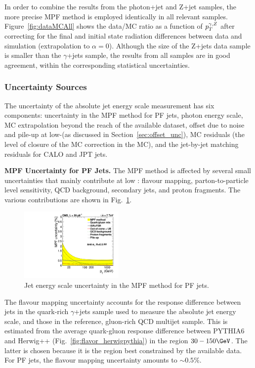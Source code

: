 In order to combine the results from the photon+jet and Z+jet samples, the more precise MPF method is employed identically in all relevant samples. Figure~\ref{fig:dataMCAll} shows the data/MC ratio as a function of $p_{{T}}^{\gamma,Z}$ after correcting for the final and initial state radiation differences between data and simulation (extrapolation to $\alpha=0$). Although the size of the Z+jets data sample is smaller than the $\gamma$+jets sample, the results from all samples are in good agreement, within the corresponding statistical uncertainties.

\subsubsection{Uncertainty Sources}

The uncertainty of the absolute jet energy scale measurement has six components: uncertainty in the MPF method for PF jets, photon energy scale, MC extrapolation beyond the reach of the available dataset, offset due to noise and pile-up at low-\pt (as discussed in Section~\ref{sec:offset_unc}), MC residuals (the level of closure of the MC correction in the MC), and the jet-by-jet matching residuals for CALO and JPT jets.  

{\bf MPF Uncertainty for PF Jets.} The MPF method is affected by several small uncertainties that mainly contribute at low \pt: flavour mapping, parton-to-particle level sensitivity, QCD background, secondary jets, and proton fragments. The various contributions are shown in Fig.~\ref{fig:jecuncert_mpf}.

\begin{figure}[ht!]
  \begin{center}
    \includegraphics[width=0.45\textwidth]{Figures/JEC/JECUncert_MPF}
    \caption{Jet energy scale uncertainty in the MPF method for PF jets.}
    \label{fig:jecuncert_mpf}
  \end{center}
\end{figure}

The flavour mapping uncertainty accounts for the response difference between jets in the quark-rich $\gamma$+jets sample used to measure the absolute jet energy scale, and those in the reference, gluon-rich QCD multijet sample. This is estimated from the average quark-gluon response difference between {\sc PYTHIA6} and {\sc Herwig++} (Fig.~\ref{fig:flavor_herwigpythia}) in the region $30-150\GeV$. The latter is chosen because it is the \pt region best constrained by the available data. For PF jets, the flavour mapping uncertainty amounts to $\sim 0.5\%$.

